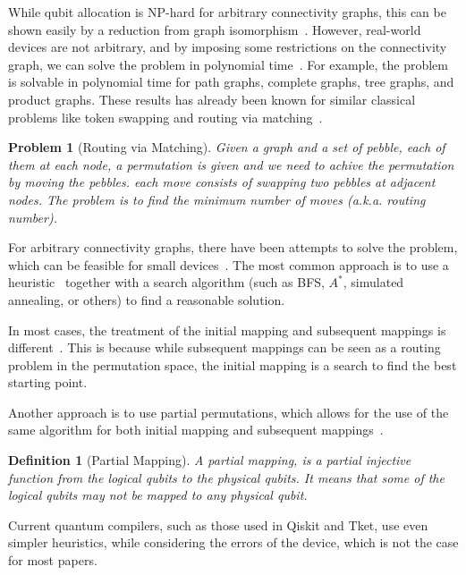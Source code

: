 \documentclass{report}
\newtheorem{definition}{Definition}
\newtheorem{problem}{Problem}
\begin{document}
While qubit allocation is NP-hard for arbitrary connectivity graphs, this can be shown easily by a reduction from graph isomorphism~\cite{siraichi2018}. However, real-world devices are not arbitrary, and by imposing some restrictions on the connectivity graph, we can solve the problem in polynomial time~\cite{childs}. For example, the problem is solvable in polynomial time for path graphs, complete graphs, tree graphs, and product graphs. These results has already been known for similar classical problems like token swapping and routing via matching~\cite{banerjee2017}.

\begin{problem}[Routing via Matching]
  Given a graph and a set of pebble, each of them at each node, a permutation is given and we need to achive the permutation by moving the pebbles. each move consists of swapping two pebbles at adjacent nodes. The problem is to find the minimum number of moves (a.k.a. routing number).
\end{problem}

For arbitrary connectivity graphs, there have been attempts to solve the problem, which can be feasible for small devices~\cite{siraichi2018}. The most common approach is to use a heuristic~\cite{zhang2021, itoko2019, cowtan2019} together with a search algorithm (such as BFS, $A^*$\cite{zulehner2018}, simulated annealing\cite{zhou2020}, or others\cite{li2019}) to find a reasonable solution.

In most cases, the treatment of the initial mapping and subsequent mappings is different~\cite{zhou2020, li2019}. This is because while subsequent mappings can be seen as a routing problem in the permutation space, the initial mapping is a search to find the best starting point.

Another approach is to use partial permutations, which allows for the use of the same algorithm for both initial mapping and subsequent mappings~\cite{childs, zulehner2018}.

\begin{definition}[Partial Mapping]
  A partial mapping, is a partial injective function from the logical qubits to the physical qubits.
  It means that some of the logical qubits may not be mapped to any physical qubit.
\end{definition}

Current quantum compilers, such as those used in Qiskit\cite{qiskit2023, cross2022, murali2019} and Tket\cite{sivarajah2021}, use even simpler heuristics, while considering the errors of the device, which is not the case for most papers.
\end{document}
